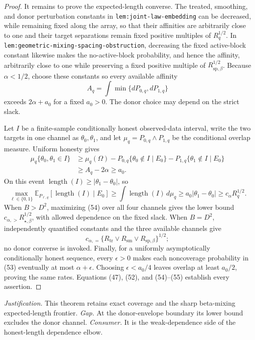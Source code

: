 \documentclass{article}
\begin{document}
\begin{proof}
It remains to prove the expected-length converse.  The treated, smoothing, and donor perturbation constants in \texttt{lem:joint-law-embedding} can be decreased, while remaining fixed along the array, so that their affinities are arbitrarily close to one and their target separations remain fixed positive multiples of \(R_q^{1/2}\).  In \texttt{lem:geometric-mixing-spacing-obstruction}, decreasing the fixed active-block constant likewise makes the no-active-block probability, and hence the affinity, arbitrarily close to one while preserving a fixed positive multiple of \(R_{\mathrm{sp},\beta}^{1/2}\).  Because \(\alpha<1/2\), choose these constants so every available affinity
\[
A_q=\int\min\{dP_{0,q},dP_{1,q}\}
\]
exceeds \(2\alpha+a_0\) for a fixed \(a_0>0\).  The donor choice may depend on the strict slack.

Let \(I\) be a finite-sample conditionally honest observed-data interval, write the two targets in one channel as \(\theta_0,\theta_1\), and let \(\mu_q=P_{0,q}\wedge P_{1,q}\) be the conditional overlap measure.  Uniform honesty gives
\[
\begin{aligned}
\mu_q\{\theta_0,\theta_1\in I\}
&\geq\mu_q(\Omega)
-P_{0,q}\{\theta_0\notin I\mid E_0\}
-P_{1,q}\{\theta_1\notin I\mid E_0\}\\
&\geq A_q-2\alpha\geq a_0.
\end{aligned}
\tag{53}
\]
On this event \(\operatorname{length}(I)\geq|\theta_1-\theta_0|\), so
\[
\max_{\ell\in\{0,1\}}
\mathbb E_{P_{\ell,q}}[\operatorname{length}(I)\mid E_0]
\geq\int\operatorname{length}(I)\,d\mu_q
\geq a_0|\theta_1-\theta_0|
\geq c_\alpha R_q^{1/2}.
\tag{54}
\]
When \(B>D^2\), maximizing (54) over all four channels gives the lower bound
\(c_{\alpha,>}R_{\star,\beta}^{1/2}\), with allowed dependence on the fixed slack.  When \(B=D^2\), independently quantified constants and the three available channels give
\[
c_{\alpha,=}
\{R_{\mathrm{tr}}\vee R_{\mathrm{sm}}\vee R_{\mathrm{sp},\beta}\}^{1/2};
\tag{55}
\]
no donor converse is invoked.  Finally, for a uniformly asymptotically conditionally honest sequence, every \(\epsilon>0\) makes each noncoverage probability in (53) eventually at most \(\alpha+\epsilon\).  Choosing \(\epsilon<a_0/4\) leaves overlap at least \(a_0/2\), proving the same rates.  Equations (47), (52), and (54)--(55) establish every assertion.
\end{proof}
\par\smallskip\noindent \textit{Justification.} This theorem retains exact coverage and the sharp beta-mixing expected-length frontier. \textit{Gap.} At the donor-envelope boundary its lower bound excludes the donor channel. \textit{Consumer.} It is the weak-dependence side of the honest-length dependence elbow.
\end{document}

